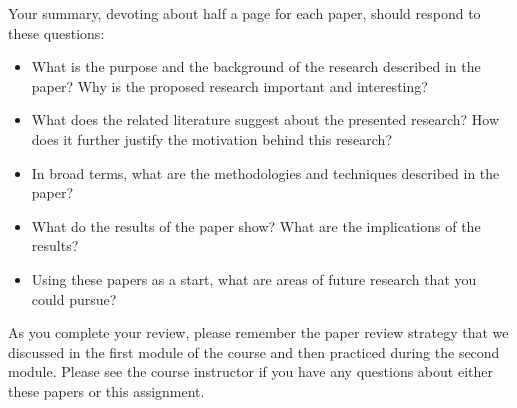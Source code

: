   Your summary, devoting about half a page for each paper, should respond to these questions:

\begin{itemize}
  \itemsep0in
  \item What is the purpose and the background of the research described in the paper? Why is the proposed research
    important and interesting?

  \item What does the related literature suggest about the presented research? How does it further justify the motivation
    behind this research?

  \item In broad terms, what are the methodologies and techniques described in the paper? 

  \item What do the results of the paper show? What are the implications of the results?

  \item Using these papers as a start, what are areas of future research that you could pursue?

\end{itemize}

  As you complete your review, please remember the paper review strategy that we discussed in the first module of the
  course and then practiced during the second module. Please see the course instructor if you have any questions about
  either these papers or this assignment.


